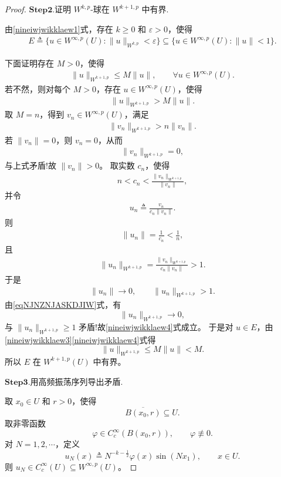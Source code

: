 \documentclass[../../main.tex]{subfiles}
\begin{document}
\begin{proof}
\noindent$\mathbf{Step}\bm{2}$.{\heiti 证明 \(W^{k,p}\)-球在 \(W^{k+1,p}\) 中有界.}

由\eqref{nineiwjwikklaew1}式，存在 \(k\geqslant0\) 和 \(\varepsilon>0\)，使得
\begin{align}
E\triangleq\{u\in W^{\infty,p}(U):\|u\|_{W^{k,p}}<\varepsilon\}
\subseteq
\{u\in W^{\infty,p}(U):\|u\|<1\}.
\label{nineiwjwikklaew3}
\end{align}

下面证明存在 \(M>0\)，使得
\begin{align}
\|u\|_{W^{k+1,p}}\leqslant M\|u\|,\qquad \forall u\in W^{\infty,p}(U).
\label{nineiwjwikklaew4}
\end{align}
若不然，则对每个 \(M>0\)，存在 \(u\in W^{\infty,p}(U)\)，使得
\begin{align*}
\|u\|_{W^{k+1,p}}>M\|u\|.
\end{align*}
取 \(M=n\)，得到 \(v_n\in W^{\infty,p}(U)\)，满足
\begin{align*}
\|v_n\|_{W^{k+1,p}}>n\|v_n\|.
\end{align*}
若 \(\|v_n\|=0\)，则 \(v_n=0\)，从而
\begin{align*}
\|v_n\|_{W^{k+1,p}}=0,
\end{align*}
与上式矛盾!故 \(\|v_n\|>0\)。
取实数 \(c_n\)，使得
\begin{align*}
n<c_n<\frac{\|v_n\|_{W^{k+1,p}}}{\|v_n\|},
\end{align*}
并令
\begin{align*}
u_n\triangleq\frac{v_n}{c_n\|v_n\|}.
\end{align*}
则
\begin{align*}
\|u_n\|=\frac1{c_n}<\frac1n,
\end{align*}
且
\begin{align*}
\|u_n\|_{W^{k+1,p}}
=\frac{\|v_n\|_{W^{k+1,p}}}{c_n\|v_n\|}>1.
\end{align*}
于是
\begin{align*}
\|u_n\|\to0,
\qquad
\|u_n\|_{W^{k+1,p}}>1.
\end{align*}
由\eqref{eqNJNZNJASKDJIW}式，有
\[
\|u_n\|_{W^{k+1,p}}\to 0,
\]
与 \(\|u_n\|_{W^{k+1,p}}\geqslant1\) 矛盾!故\eqref{nineiwjwikklaew4}式成立。
于是对 \(u\in E\)，由\eqref{nineiwjwikklaew3}\eqref{nineiwjwikklaew4}式得
\[
\|u\|_{W^{k+1,p}}
\leqslant M\|u\|
<M.
\]
所以 \(E\) 在 \(W^{k+1,p}(U)\) 中有界。

\noindent$\mathbf{Step}\bm{3}$.{\heiti 用高频振荡序列导出矛盾.}

取 \(x_0\in U\) 和 \(r>0\)，使得
\[
\overline{B(x_0,r)}\subseteq U.
\]
取非零函数
\[
\varphi\in C_c^\infty(B(x_0,r)),\qquad \varphi\not\equiv0.
\]
对 \(N=1,2,\cdots\)，定义
\[
u_N(x)\triangleq N^{-k-\frac12}\varphi(x)\sin(Nx_1),\qquad x\in U.
\]
则 \(u_N\in C_c^\infty(U)\subseteq W^{\infty,p}(U)\)。


\end{proof}
\end{document}
